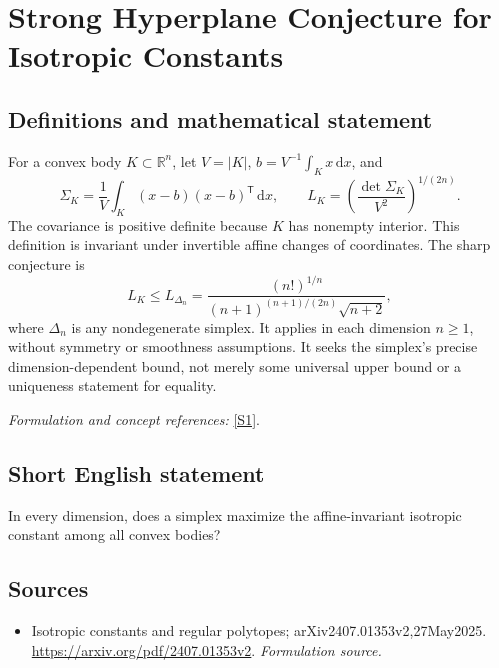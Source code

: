 \documentclass[11pt]{article}
\begin{document}
\section*{\texorpdfstring{Strong Hyperplane Conjecture for Isotropic Constants}{Strong Hyperplane Conjecture for Isotropic Constants}}\label{358}
\subsection{Definitions and mathematical statement}
For a convex body $K\subset{\mathbb{R}}^n$, let $V=|K|$, $b=V^{-1}\int_Kx{\,\mathrm{d}} x$, and
\[
 \Sigma_K=\frac1V\int_K(x-b)(x-b)^{\mathsf T}{\,\mathrm{d}} x,
 \qquad L_K=\left(\frac{\det\Sigma_K}{V^2}\right)^{1/(2n)}.
\]
The covariance is positive definite because $K$ has nonempty interior. This definition is invariant under invertible affine changes of coordinates. The sharp conjecture is
\[
 L_K\le L_{\Delta_n}
 =\frac{(n!)^{1/n}}{(n+1)^{(n+1)/(2n)}\sqrt{n+2}},
\]
where $\Delta_n$ is any nondegenerate simplex. It applies in each dimension $n\ge1$, without symmetry or smoothness assumptions. It seeks the simplex's precise dimension-dependent bound, not merely some universal upper bound or a uniqueness statement for equality.
\par\smallskip\textit{Formulation and concept references:} \href{https://arxiv.org/pdf/2407.01353v2}{[S1]}.

\subsection{Short English statement}
In every dimension, does a simplex maximize the affine-invariant isotropic constant among all convex bodies?
\subsection{Sources}
\begin{itemize}
\item[S1]Isotropic constants and regular polytopes; arXiv2407.01353v2,27May2025.
\url{https://arxiv.org/pdf/2407.01353v2}.
\textit{Formulation source.}
\end{itemize}
\end{document}
